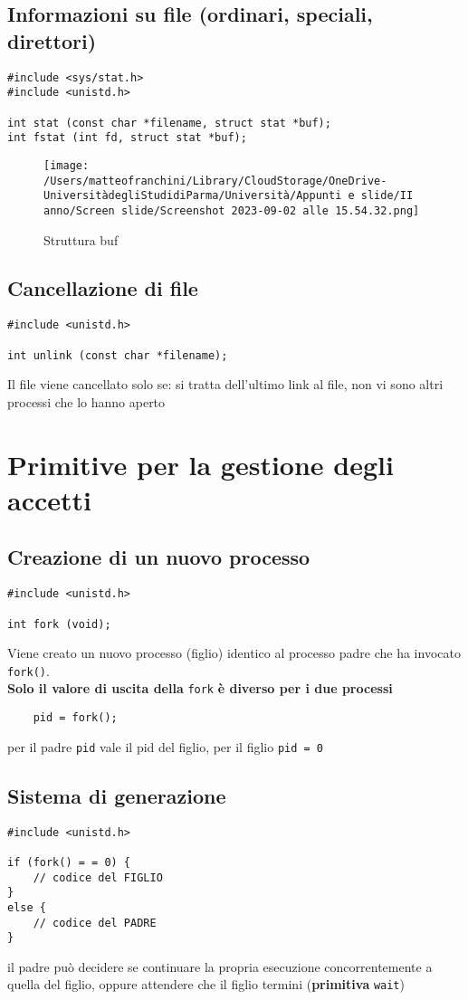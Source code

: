 \documentclass[italian,12pt,a4paper]{article}
\begin{document}
\subsection{Informazioni su file (ordinari, speciali, direttori)}
\begin{lstlisting}
#include <sys/stat.h>
#include <unistd.h>

int stat (const char *filename, struct stat *buf);
int fstat (int fd, struct stat *buf);	
\end{lstlisting}
\begin{figure}[h!]
	\centering
	\texttt{[image: /Users/matteofranchini/Library/CloudStorage/OneDrive-UniversitàdegliStudidiParma/Università/Appunti e slide/II anno/Screen slide/Screenshot 2023-09-02 alle 15.54.32.png]}
	\caption{Struttura buf}
\end{figure}
\subsection{Cancellazione di file}
\begin{lstlisting}
#include <unistd.h>

int unlink (const char *filename);
\end{lstlisting}
Il file viene cancellato solo se: si tratta dell'ultimo link al file, non vi sono altri processi che lo hanno aperto
\section{Primitive per la gestione degli accetti}
\subsection{Creazione di un nuovo processo}
\begin{lstlisting}
#include <unistd.h>

int fork (void);
\end{lstlisting}
Viene creato un nuovo processo (figlio) identico al processo padre che ha invocato \verb|fork()|.\\
\textbf{Solo il valore di uscita della} \verb|fork| \textbf{è diverso per i due processi}
\begin{verbatim}
	pid = fork();
\end{verbatim}
per il padre \verb|pid| vale il pid del figlio, per il figlio \verb|pid = 0| 
\subsection{Sistema di generazione}
\begin{lstlisting}
#include <unistd.h>

if (fork() = = 0) {
	// codice del FIGLIO
}
else {
	// codice del PADRE
}
\end{lstlisting}
il padre può decidere se continuare la propria esecuzione concorrentemente a quella del figlio, oppure attendere che il figlio termini (\textbf{primitiva } \verb|wait|)
\end{document}
